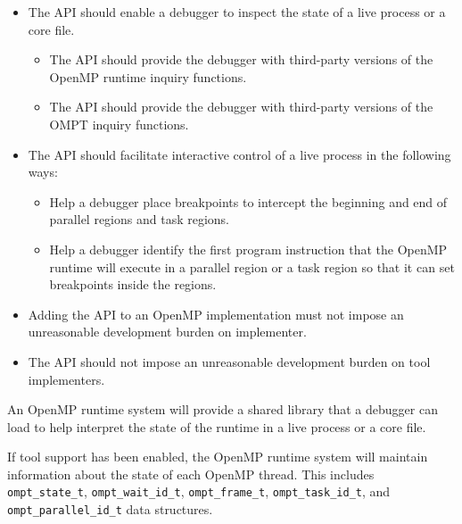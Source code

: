 \documentclass{article}
\begin{document}
\begin{itemize}
\item The API should enable a debugger to inspect the state of a live process or a core file.
\begin{itemize}
\item The API should provide the debugger with third-party versions of the OpenMP runtime inquiry functions. 
\item The API should provide the debugger with third-party versions of the OMPT inquiry functions.
\end{itemize}
\item The API should facilitate interactive control of a live process in the following ways:
\begin{itemize}
\item Help a debugger place breakpoints to intercept the beginning and end of parallel regions and task regions.
\item Help a debugger identify the first program instruction that the OpenMP runtime will execute in a parallel region or a task region so that it can set breakpoints inside the regions.
\end{itemize}
\item Adding the API to an OpenMP implementation must not impose an unreasonable development burden on implementer.
\item The API should not impose an unreasonable development burden on tool implementers.
\end{itemize}








An OpenMP runtime system will provide a shared library that a debugger can load to help interpret the state of the runtime in a live process or a core file.

\sloppy
If tool support has been enabled, the OpenMP runtime system will maintain
information about the state of each OpenMP thread. This includes
\verb|ompt_state_t|, \verb|ompt_wait_id_t|, \verb|ompt_frame_t|, \verb|ompt_task_id_t|, and \verb|ompt_parallel_id_t| data structures.
\end{document}
